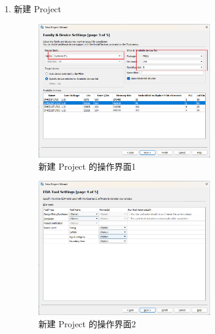 \documentclass[UTF8]{article}
\theoremstyle{MyLineTheoremStyle} %
\theoremstyle{MyBlockTheoremStyle} %
\theoremstyle{MySubsubsectionStyle} %
\begin{document}
\begin{enumerate}
    \item 新建 Project
    \begin{figure}[H]
        \centering
        \includegraphics[width=0.7\textwidth]{step1.png}
        \caption{新建 Project 的操作界面1}
        \label{fig:step1}
    \end{figure}
    \begin{figure}[H]
        \centering
        \includegraphics[width=0.7\textwidth]{step1_2.png}
        \caption{新建 Project 的操作界面2}
        \label{fig:step1_2}
    \end{figure}

\cleardoublepage


\end{enumerate}
\end{document}
